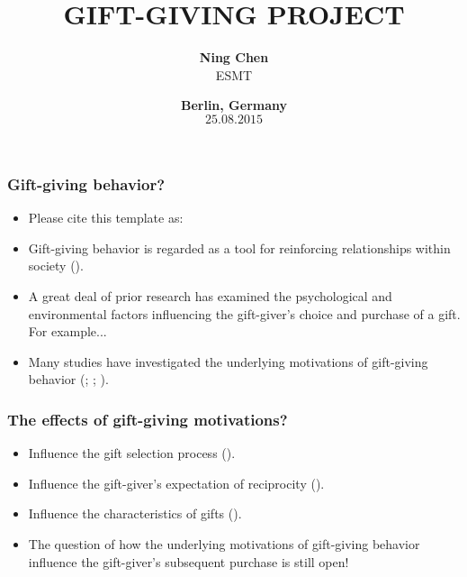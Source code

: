 \documentclass[11pt]{beamer}
\begin{document}
\title{GIFT-GIVING PROJECT}

\author[Ning Chen] %
{
{\bf Ning Chen}\\
{\small ESMT}\\[1ex]
}

\date{
{\bf Berlin, Germany}\\
{\small $25.08.2015$}
}


\begin{frame}
    \titlepage
    \note{~}
\end{frame}


\begin{frame}[t]
    \frametitle{Gift-giving behavior?}
    \begin{itemize}
        \item<+-> Please cite this template as: \citet{GaudeckerEconProjectTemplates}
        \item<+-> Gift-giving behavior is regarded as a tool for reinforcing relationships within society (\cite{Caplow1982}).
        \item<+-> A great deal of prior research has examined the psychological and environmental factors influencing the gift-giver's choice and purchase of a gift. For example...
        \item<+-> Many studies have investigated the underlying motivations of gift-giving behavior (\cite{Goodwin1990}; \cite{Wolfinbarger1990}; \cite{sherry1983}).
    \end{itemize}
    \note{~}
\end{frame}


\begin{frame}[t]
\frametitle{The effects of gift-giving motivations?}
\begin{itemize}
\item<+-> Influence the gift selection process (\cite{Goodwin1990}).
\item<+-> Influence the gift-giver's expectation of reciprocity (\cite{Goodwin1990}).
\item<+-> Influence the characteristics of gifts (\cite{Goodwin1990}).
\item<+-> The question of how the underlying motivations of gift-giving behavior influence the gift-giver's subsequent purchase is still open!
\end{itemize}
\note{~}
\end{frame}
\end{document}
